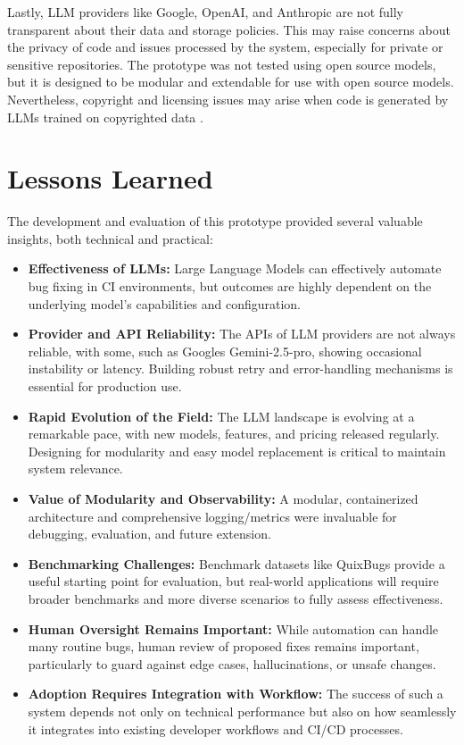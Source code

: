 Lastly, LLM providers like Google, OpenAI, and Anthropic are not fully transparent about their data and storage policies. This may raise concerns about the privacy of code and issues processed by the system, especially for private or sensitive repositories. The prototype was not tested using open source models, but it is designed to be modular and extendable for use with open source models. Nevertheless, copyright and licensing issues may arise when code is generated by LLMs trained on copyrighted data \cite{sauvolaFutureSoftwareDevelopment2024, houLargeLanguageModels2024}.

\section{Lessons Learned}
The development and evaluation of this prototype provided several valuable insights, both technical and practical:

\begin{itemize}
    \item \textbf{Effectiveness of LLMs:} Large Language Models can effectively automate bug fixing in CI environments, but outcomes are highly dependent on the underlying model's capabilities and configuration.
    \item \textbf{Provider and API Reliability:} The APIs of LLM providers are not always reliable, with some, such as Googles Gemini-2.5-pro, showing occasional instability or latency. Building robust retry and error-handling mechanisms is essential for production use.
    \item \textbf{Rapid Evolution of the Field:} The LLM landscape is evolving at a remarkable pace, with new models, features, and pricing released regularly. Designing for modularity and easy model replacement is critical to maintain system relevance.
    \item \textbf{Value of Modularity and Observability:} A modular, containerized architecture and comprehensive logging/metrics were invaluable for debugging, evaluation, and future extension.
    \item \textbf{Benchmarking Challenges:} Benchmark datasets like QuixBugs provide a useful starting point for evaluation, but real-world applications will require broader benchmarks and more diverse scenarios to fully assess effectiveness.
    \item \textbf{Human Oversight Remains Important:} While automation can handle many routine bugs, human review of proposed fixes remains important, particularly to guard against edge cases, hallucinations, or unsafe changes.
    \item \textbf{Adoption Requires Integration with Workflow:} The success of such a system depends not only on technical performance but also on how seamlessly it integrates into existing developer workflows and CI/CD processes.
\end{itemize}

